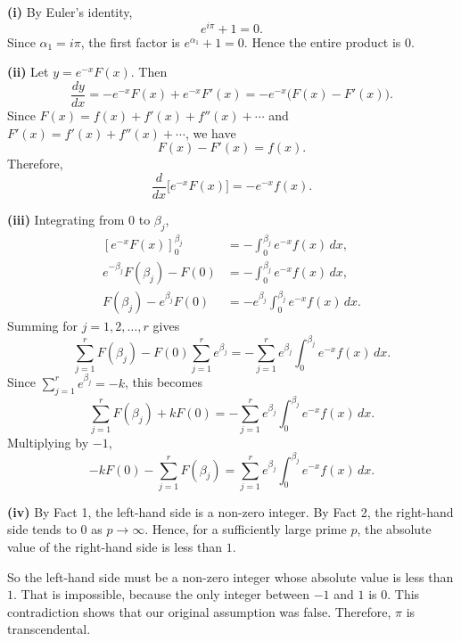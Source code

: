 \begin{solution}
\textbf{(i)} By Euler's identity,
\[
e^{i\pi}+1=0.
\]
Since $\alpha_1=i\pi$, the first factor is $e^{\alpha_1}+1=0$. Hence the entire product is $0$.

\textbf{(ii)} Let $y=e^{-x}F(x)$. Then
\[
\frac{dy}{dx}
=-e^{-x}F(x)+e^{-x}F'(x)
=-e^{-x}\bigl(F(x)-F'(x)\bigr).
\]
Since $F(x)=f(x)+f'(x)+f''(x)+\cdots$ and $F'(x)=f'(x)+f''(x)+\cdots$, we have
\[
F(x)-F'(x)=f(x).
\]
Therefore,
\[
\frac{d}{dx}\bigl[e^{-x}F(x)\bigr]=-e^{-x}f(x).
\]

\textbf{(iii)} Integrating from $0$ to $\beta_j$,
\begin{align*}
\left[e^{-x}F(x)\right]_0^{\beta_j}
&=-\int_0^{\beta_j} e^{-x}f(x)\,dx,\\
e^{-\beta_j}F(\beta_j)-F(0)
&=-\int_0^{\beta_j} e^{-x}f(x)\,dx,\\
F(\beta_j)-e^{\beta_j}F(0)
&=-e^{\beta_j}\int_0^{\beta_j} e^{-x}f(x)\,dx.
\end{align*}
Summing for $j=1,2,\dots,r$ gives
\[
\sum_{j=1}^r F(\beta_j)-F(0)\sum_{j=1}^r e^{\beta_j}
=-\sum_{j=1}^r e^{\beta_j}\int_0^{\beta_j} e^{-x}f(x)\,dx.
\]
Since $\sum_{j=1}^r e^{\beta_j}=-k$, this becomes
\[
\sum_{j=1}^r F(\beta_j)+kF(0)
=-\sum_{j=1}^r e^{\beta_j}\int_0^{\beta_j} e^{-x}f(x)\,dx.
\]
Multiplying by $-1$,
\[
-kF(0)-\sum_{j=1}^r F(\beta_j)
=\sum_{j=1}^r e^{\beta_j}\int_0^{\beta_j} e^{-x}f(x)\,dx.
\]

\textbf{(iv)} By Fact 1, the left-hand side is a non-zero integer. By Fact 2, the right-hand side tends to $0$ as $p\to\infty$. Hence, for a sufficiently large prime $p$, the absolute value of the right-hand side is less than $1$.

So the left-hand side must be a non-zero integer whose absolute value is less than $1$. That is impossible, because the only integer between $-1$ and $1$ is $0$. This contradiction shows that our original assumption was false. Therefore, $\pi$ is transcendental.
\end{solution}

